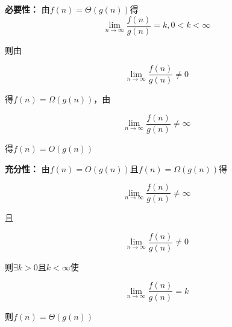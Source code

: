 \documentclass[a4paper,twoside]{article}
\begin{document}
\begin{spacing}{1.2}
\textbf{必要性：} 
由$f(n)=\Theta(g(n))$得
$$
\lim_{n \to \infty}\frac{f(n)}{g(n)}=k, 0<k<\infty
$$

则由

$$
\lim_{n \to \infty}\frac{f(n)}{g(n)} \ne 0
$$

得$f(n)=\Omega(g(n))$，由

$$
\lim_{n \to \infty}\frac{f(n)}{g(n)} \ne \infty
$$

得$f(n)=O(g(n))$

\textbf{充分性：}
由$f(n)=O(g(n))$且$f(n)=\Omega(g(n))$得

$$
\lim_{n \to \infty}\frac{f(n)}{g(n)} \ne \infty
$$

且

$$
\lim_{n \to \infty}\frac{f(n)}{g(n)} \ne 0
$$

则$\exists k>0$且$k<\infty$使

$$
\lim_{n \to \infty}\frac{f(n)}{g(n)} = k
$$

则$f(n)=\Theta(g(n))$




\end{spacing}
\end{document}
